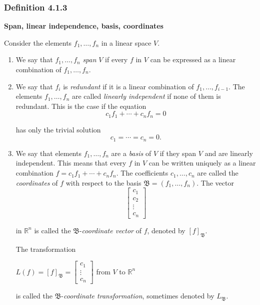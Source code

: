 \documentclass{report}
\begin{document}
\subsubsection*{Definition 4.1.3}
\par\noindent\textbf{Span, linear independence, basis, coordinates}
\par\noindent Consider the elements $f_{1},\ldots{},f_{n}$ in a linear space $V$.
\renewcommand{\labelenumi}{\textbf{\alph{enumi}.}}
\begin{enumerate}
\item We say that $f_{1},\ldots{},f_{n}$ \textit{span} $V$ if every $f$ in $V$ can be expressed as a linear combination of $f_{1},\ldots{},f_{n}$.
\item We say that $f_{i}$ is \textit{redundant} if it is a linear combination of $f_{1},\ldots{},f_{i-1}$. The elements $f_{1},\ldots{},f_{n}$ are called \textit{linearly independent} if none of them is redundant. This is the case if the equation
\[c_{1}f_{1}+\cdots{}+c_{n}f_{n}=0\]
\par\noindent has only the trivial solution
\[c_{1}=\cdots{}=c_{n}=0.\]
\item We say that elements $f_{1},\ldots{},f_{n}$ are a \textit{basis} of $V$ if they span $V$ and are linearly independent. This means that every $f$ in $V$ can be written uniquely as a linear combination $f=c_{1}f_{1}+\cdots{}+c_{n}f_{n}$. The coefficients $c_{1},\ldots{},c_{n}$ are called the \textit{coordinates} of $f$ with respect to the basis $\mathfrak{B}=(f_{1},\ldots{},f_{n})$. The vector
\[\left[\begin{array}{c}c_{1}\\ c_{2}\\ \vdots{}\\ c_{n}\end{array}\right]\]
\par\noindent in $\mathbb{R}^{n}$ is called the $\mathfrak{B}$-\textit{coordinate vector} of $f$, denoted by $[f]_{\mathfrak{B}}$.
\par\noindent The transformation
\par\noindent\begin{center}$\displaystyle L(f)=[f]_{\mathfrak{B}}=\left[\begin{array}{c}c_{1}\\ \vdots{}\\ c_{n}\end{array}\right]$ from $V$ to $\mathbb{R}^{n}$\end{center}
\par\noindent is called the $\mathfrak{B}$-\textit{coordinate transformation}, sometimes denoted by $L_{\mathfrak{B}}$.
\end{enumerate}
\end{document}
